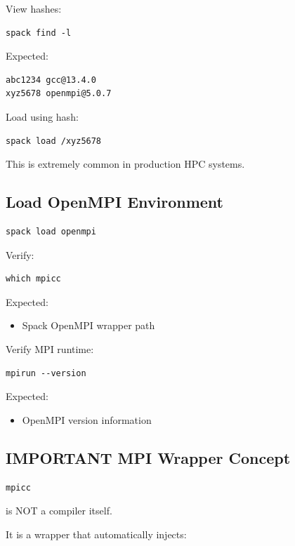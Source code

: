 \documentclass[11pt]{article}
\begin{document}
View hashes:

\begin{verbatim}
spack find -l
\end{verbatim}

Expected:

\begin{verbatim}
abc1234 gcc@13.4.0
xyz5678 openmpi@5.0.7
\end{verbatim}

Load using hash:

\begin{verbatim}
spack load /xyz5678
\end{verbatim}

This is extremely common in production HPC systems.
\subsection{Load OpenMPI Environment}
\label{sec:orgeb278a0}

\begin{verbatim}
spack load openmpi
\end{verbatim}

Verify:

\begin{verbatim}
which mpicc
\end{verbatim}

Expected:
\begin{itemize}
\item Spack OpenMPI wrapper path
\end{itemize}

Verify MPI runtime:

\begin{verbatim}
mpirun --version
\end{verbatim}

Expected:
\begin{itemize}
\item OpenMPI version information
\end{itemize}
\subsection{IMPORTANT MPI Wrapper Concept}
\label{sec:org77c5862}

\begin{verbatim}
mpicc
\end{verbatim}

is NOT a compiler itself.

It is a wrapper that automatically injects:
\end{document}
